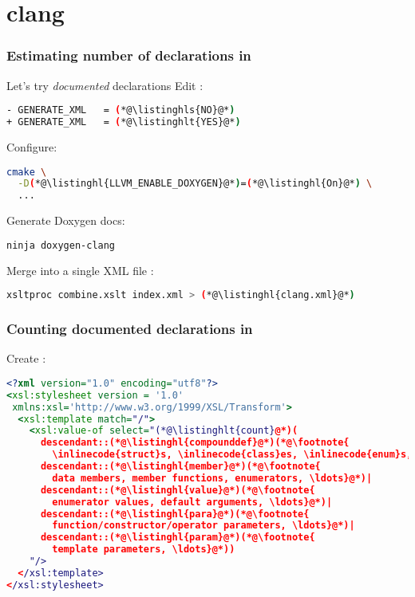 \documentclass[compress,table,xcolor=table]{beamer}
\begin{document}
\section{clang}
\begin{frame}[fragile]
  \frametitle{Estimating number of declarations in }
  Let's try {\em \larger documented} declarations
  \vfill
  Edit :
  \begin{lstlisting}[language=bash,basicstyle=\scriptsize\ttfamily]
- GENERATE_XML   = (*@\listinghls{NO}@*)
+ GENERATE_XML   = (*@\listinghlt{YES}@*)
  \end{lstlisting}
  Configure:
  \begin{lstlisting}[language=bash,basicstyle=\scriptsize\ttfamily]
cmake \
  -D(*@\listinghl{LLVM_ENABLE_DOXYGEN}@*)=(*@\listinghl{On}@*) \
  ...
  \end{lstlisting}
  Generate Doxygen docs:
  \begin{lstlisting}[language=bash,basicstyle=\scriptsize\ttfamily]
ninja doxygen-clang
  \end{lstlisting}
  Merge into a single XML file : 
  \begin{lstlisting}[language=bash,basicstyle=\scriptsize\ttfamily]
xsltproc combine.xslt index.xml > (*@\listinghl{clang.xml}@*)
  \end{lstlisting}
\end{frame}
\begin{frame}[fragile]
  \frametitle{Counting documented declarations in \inlinecode{clang}}
  Create :
  \begin{lstlisting}[language=xslt,basicstyle=\scriptsize\ttfamily]
<?xml version="1.0" encoding="utf8"?>
<xsl:stylesheet version = '1.0'
 xmlns:xsl='http://www.w3.org/1999/XSL/Transform'>
  <xsl:template match="/">
    <xsl:value-of select="(*@\listinghlt{count}@*)(
      descendant::(*@\listinghl{compounddef}@*)(*@\footnote{
        \inlinecode{struct}s, \inlinecode{class}es, \inlinecode{enum}s, \ldots}@*)|
      descendant::(*@\listinghl{member}@*)(*@\footnote{
        data members, member functions, enumerators, \ldots}@*)|
      descendant::(*@\listinghl{value}@*)(*@\footnote{
        enumerator values, default arguments, \ldots}@*)|
      descendant::(*@\listinghl{para}@*)(*@\footnote{
        function/constructor/operator parameters, \ldots}@*)|
      descendant::(*@\listinghl{param}@*)(*@\footnote{
        template parameters, \ldots}@*))
    "/>
  </xsl:template>
</xsl:stylesheet>
  \end{lstlisting}
\end{frame}
\end{document}
